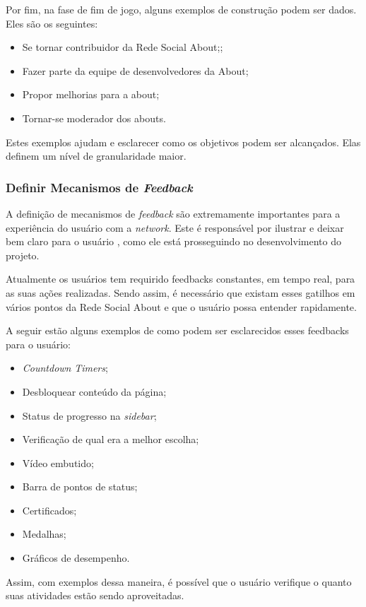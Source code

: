 Por fim, na fase de fim de jogo, alguns exemplos de construção podem ser dados.
Eles são os seguintes:
\begin{itemize}
    \item Se tornar contribuidor da Rede Social About;;
    \item Fazer parte da equipe de desenvolvedores da About;
    \item Propor melhorias para a about;
    \item Tornar-se moderador dos abouts.
\end{itemize}

Estes exemplos ajudam e esclarecer como os objetivos podem ser alcançados. Elas
definem um nível de
granularidade maior.

\subsubsection{Definir Mecanismos de \textit{Feedback}}
\label{sub:define_feedback_mechanics}
A definição de mecanismos de \textit{feedback} são extremamente importantes para a experiência do usuário
com a \textit{network}. Este é responsável por ilustrar e deixar bem claro para o usuário
, como ele está
prosseguindo no desenvolvimento do projeto.

Atualmente os usuários tem requirido feedbacks constantes, em tempo real, para as suas ações
realizadas. Sendo assim, é necessário que existam esses gatilhos em vários pontos da
Rede Social About e que o usuário possa entender rapidamente.

A seguir estão alguns exemplos de como podem ser esclarecidos esses feedbacks para o usuário:

\begin{itemize}
    \item \textit{Countdown} \textit{Timers};
    \item Desbloquear conteúdo da página;
    \item Status de progresso na \textit{sidebar};
    \item Verificação de qual era a melhor escolha;
    \item Vídeo embutido;
    \item Barra de pontos de status;
    \item Certificados;
    \item Medalhas;
    \item Gráficos de desempenho.
\end{itemize}

Assim, com exemplos dessa maneira, é possível que o usuário verifique o quanto suas atividades estão
sendo aproveitadas.

